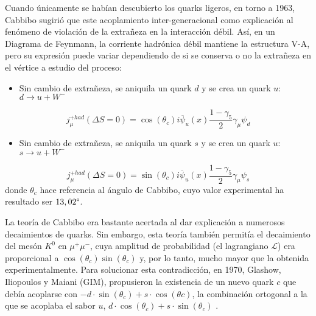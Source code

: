 Cuando únicamente se habían descubierto los quarks ligeros, en torno a 1963, Cabbibo sugirió que este acoplamiento inter-generacional como explicación al fenómeno de violación de la extrañeza en la interacción débil. Así, en un Diagrama de Feynmann, la corriente hadrónica débil mantiene la estructura V-A, pero su expresión puede variar dependiendo de si se conserva o no la extrañeza en el vértice a estudio del proceso:
\begin{itemize}
\item Sin cambio de extrañeza, se aniquila un quark $d$ y se crea un quark $u$: $d \rightarrow u + W^{-}$
\end{itemize}
\begin{equation}
j_{\mu}^{+had}(\Delta S= 0)=\cos \left( \theta _{c}\right) i\overline{\psi }_{u}\left( x\right) \dfrac{1-\gamma _{5}}{2}\gamma _{\mu }\psi _{d}
\end{equation}
\begin{itemize}
\item Sin cambio de extrañeza, se aniquila un quark $s$ y se crea un quark $u$: $s \rightarrow u + W^{-}$
\end{itemize}
\begin{equation}
j_{\mu}^{+had}(\Delta S= 0)=\sin \left( \theta _{c}\right) i\overline{\psi }_{u}\left( x\right) \dfrac{1-\gamma _{5}}{2}\gamma _{\mu }\psi _{s}
\end{equation}
donde $\theta _{c}$ hace referencia al ángulo de Cabbibo, cuyo valor experimental ha resultado ser $13,02\degree$.

La teoría de Cabbibo era bastante acertada al dar explicación a numerosos decaimientos de quarks. Sin embargo, esta teoría también permitía el decaimiento del mesón $K^0$ en $\mu^{+}\mu^{-}$, cuya amplitud de probabilidad (el lagrangiano $\mathcal{L}$) era proporcional a $\cos \left( \theta _{c}\right) \sin \left( \theta _{c}\right)$ y, por lo tanto, mucho mayor que la obtenida experimentalmente.  Para solucionar esta contradicción, en 1970, Glashow, Iliopoulos y Maiani (GIM), propusieron la existencia de un nuevo quark $c$ que debía acoplarse con $-d\cdot \sin \left( \theta _{c}\right) +s\cdot \cos \left( \theta c\right)$, la combinación ortogonal a la que se acoplaba el sabor $u$, $d\cdot \cos \left( \theta _{c}\right) +s\cdot \sin \left( \theta _{c}\right)$ \cite{Griffiths2008}.

